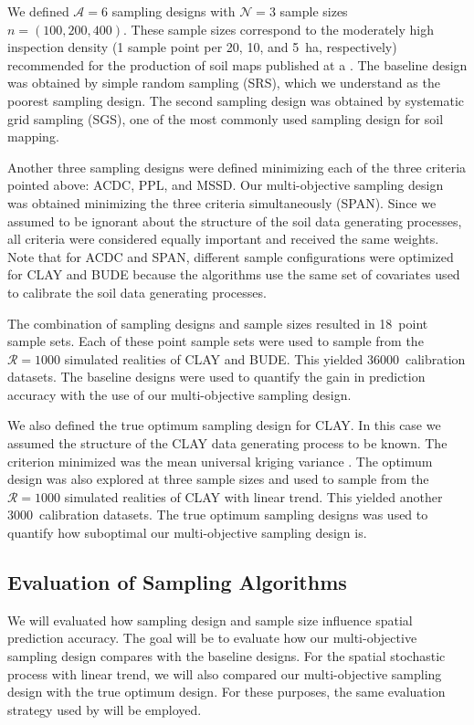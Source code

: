 We defined $\mathcal{A} = 6$ sampling designs with $\mathcal{N} = 3$ sample sizes $n = (100, 200, 400)$. These 
sample sizes correspond to the moderately high inspection density (1 sample point per 20, 10, and 
\SI{5}{\hectare}, respectively) recommended for the production of soil maps published at a  
\cite{Rossiter, 2000}. The baseline design was obtained by simple random sampling (SRS), which we understand as 
the poorest sampling design. The second sampling design was obtained by systematic grid sampling (SGS), one of 
the most commonly used sampling design for soil mapping.

Another three sampling designs were defined minimizing each of the three criteria pointed above: ACDC, PPL, and 
MSSD. Our multi-objective sampling design was obtained minimizing the three criteria simultaneously (SPAN). 
Since we assumed to be ignorant about the structure of the soil data generating processes, all criteria were 
considered equally important and received the same weights. Note that for ACDC and SPAN, different sample 
configurations were optimized for CLAY and BUDE because the algorithms use the same set of covariates used to 
calibrate the soil data generating processes.

The combination of sampling designs and sample sizes resulted in 18~point sample sets. Each of these point 
sample sets were used to sample from the $\mathcal{R} = 1000$ simulated realities of CLAY and BUDE. This 
yielded \num{36000}~calibration datasets. The baseline designs were used to quantify the gain in prediction 
accuracy with the use of our multi-objective sampling design.

We also defined the true optimum sampling design for CLAY. In this case we assumed the structure of the CLAY 
data generating process to be known. The criterion minimized was the mean universal kriging variance 
\cite{BrusEtAl2007a}. The optimum design was also explored at three sample sizes and used to sample from the 
$\mathcal{R} = 1000$ simulated realities of CLAY with linear trend. This yielded another 3000~calibration 
datasets. The true optimum sampling designs was used to quantify how suboptimal our multi-objective sampling 
design is.

\subsection{Evaluation of Sampling Algorithms}

We will evaluated how sampling design and sample size influence spatial prediction accuracy. The goal will be 
to evaluate how our multi-objective sampling design compares with the baseline designs. For the spatial 
stochastic process with linear trend, we will also compared our multi-objective sampling design with the true 
optimum design. For these purposes, the same evaluation strategy used by \cite{Samuel-RosaEtAl} will be 
employed.

